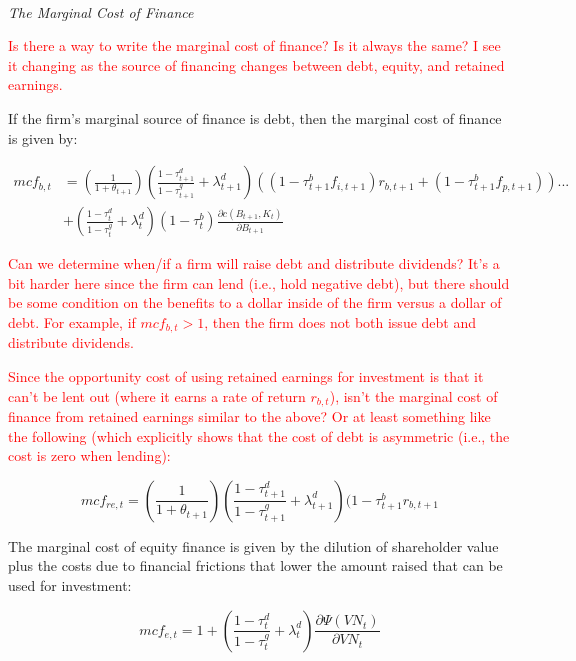 \ \\

\noindent\noindent \emph{The Marginal Cost of Finance}

\textcolor{red}{Is there a way to write the marginal cost of finance?  Is it always the same?  I see it changing as the source of financing changes between debt, equity, and retained earnings.}

If the firm's marginal source of finance is debt, then the marginal cost of finance is given by:

\begin{equation}
\begin{split}
mcf_{b,t} & = \left(\frac{1}{1+\theta_{t+1}}\right)\left(\frac{1-\tau^{d}_{t+1}}{1-\tau^{g}_{t+1}} + \lambda^{d}_{t+1}\right)\left((1-\tau^{b}_{t+1}f_{i,t+1})r_{b,t+1}+(1-\tau^{b}_{t+1}f_{p,t+1})\right)... \\
& + \left(\frac{1-\tau^{d}_{t}}{1-\tau^{g}_{t}} + \lambda^{d}_{t}\right)(1-\tau^{b}_{t})\frac{\partial c(B_{t+1},K_{t})}{\partial B_{t+1}}
\end{split}
\end{equation}

\textcolor{red}{Can we determine when/if a firm will raise debt and distribute dividends?  It's a bit harder here since the firm can lend (i.e., hold negative debt), but there should be some condition on the benefits to a dollar inside of the firm versus a dollar of debt.  For example, if $mcf_{b,t}>1$, then the firm does not both issue debt and distribute dividends.}

\textcolor{red}{Since the opportunity cost of using retained earnings for investment is that it can't be lent out (where it earns a rate of return $r_{b,t}$), isn't the marginal cost of finance from retained earnings similar to the above?  Or at least something like the following (which explicitly shows that the cost of debt is asymmetric (i.e., the cost is zero when lending):}

\begin{equation}
mcf_{re,t} =  \left(\frac{1}{1+\theta_{t+1}}\right)\left(\frac{1-\tau^{d}_{t+1}}{1-\tau^{g}_{t+1}} + \lambda^{d}_{t+1}\right)(1-\tau^{b}_{t+1}r_{b,t+1}
\end{equation}

The marginal cost of equity finance is given by the dilution of shareholder value plus the costs due to financial frictions that lower the amount raised that can be used for investment:

\begin{equation}
mcf_{e,t} =  1+ \left(\frac{1-\tau^{d}_{t}}{1-\tau^{g}_{t}} + \lambda^{d}_{t}\right)\frac{\partial \Psi(VN_{t})}{\partial VN_{t}}
\end{equation}

